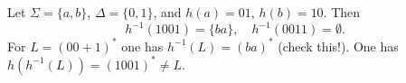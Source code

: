 

\setcounter{section}{3}
\setcounter{subsection}{4}
\setcounter{dfn}{15}

\begin{exl}
Let $\Sigma = \{a,b\}$, $\Delta = \{0, 1\}$, and $h(a) = 01$, $h(b) = 10$.
Then
\[
h^{-1}(1001) = \{ba\}, \quad h^{-1}(0011) = \emptyset.
\]
For $L = (00 + 1)^*$ one has $h^{-1}(L) = (ba)^*$ (check this!).
One has $h(h^{-1}(L)) = (1001)^* \ne L$.
\end{exl}


